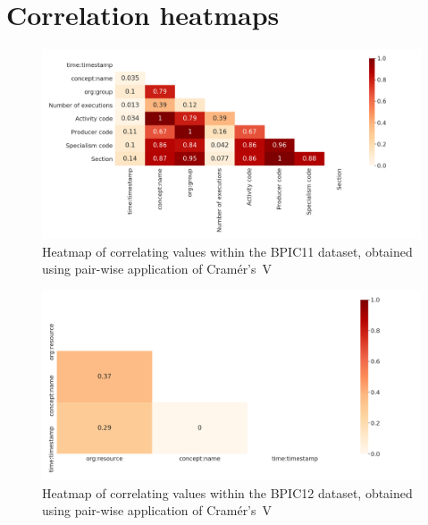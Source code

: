 \chapter{Correlation heatmaps}
\label{appendix:correlation-heatmaps}
\begin{figure}[ht!]
\centering
\includegraphics[width=\textwidth]{gfx/bpic2011/correlation-heatmap.png}
\caption[Cramér's V heatmap BPIC11]{Heatmap of correlating values within the BPIC11 dataset, obtained using pair-wise application of Cramér's~V}
\label{fig:BPIC11-correlation-heatmap}
\end{figure}

\begin{figure}[ht!]
\centering
\includegraphics[width=\textwidth]{gfx/bpic2012/correlation-heatmap.png}
\caption[Cramér's V heatmap BPIC12]{Heatmap of correlating values within the BPIC12 dataset, obtained using pair-wise application of Cramér's~V}
\label{fig:BPIC12-correlation-heatmap}
\end{figure}


